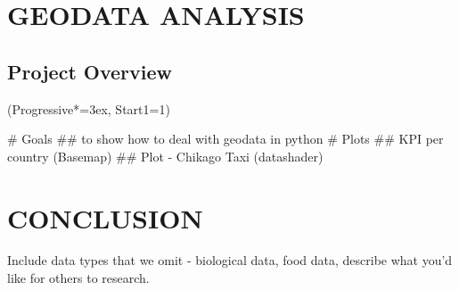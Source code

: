 \documentclass[12pt, a4paper]{article}
\let\OldEasylist\easylist
\let\OldEndEasylist\endeasylist
\renewenvironment{easylist}{%
    \OldEasylist%
    \ListProperties(Progressive*=3ex, Start1=1)%
}{%
    \OldEndEasylist%
}%
\begin{document}
\newpage
\section{GEODATA ANALYSIS}

\subsection{Project Overview}
\begin{easylist}
# Goals
## to show how to deal with geodata in python
# Plots
## KPI per country (Basemap)
 ## Plot - Chikago Taxi (datashader)
\end{easylist}


\newpage
\section{CONCLUSION}

Include data types that we omit - biological data, food data, describe what you'd like for others to research.

\newpage
\nocite{*}


\end{document}
